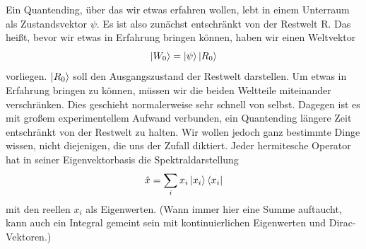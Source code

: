 \documentclass[12pt]{book}
\begin{document}
Ein Quantending, über das wir etwas erfahren wollen, lebt in einem Unterraum als Zustandsvektor $\psi$. Es ist also zunächst entschränkt von der Restwelt R. Das heißt, bevor wir etwas in Erfahrung bringen können, haben wir einen Weltvektor
\begin{equation}
\ket{W_0} = \ket{\psi}\ket{R_0}
\end{equation} 
vorliegen. $\ket{R_0}$ soll den Ausgangszustand der Restwelt darstellen. Um etwas in Erfahrung bringen zu können, müssen wir die beiden Weltteile miteinander verschränken. Dies geschieht normalerweise sehr schnell von selbst. Dagegen ist es mit großem experimentellem Aufwand verbunden, ein Quantending längere Zeit entschränkt von der Restwelt zu halten. Wir wollen jedoch ganz bestimmte Dinge wissen, nicht diejenigen, die uns der Zufall diktiert. Jeder hermitesche Operator hat in seiner Eigenvektorbasis die Spektraldarstellung
\begin{equation}
\hat{x} = \sum_i x_i \ket{x_i}\bra{x_i}
\end{equation} 
mit den reellen $x_i$ als Eigenwerten. (Wann immer hier eine Summe auftaucht, kann auch ein Integral gemeint sein mit kontinuierlichen Eigenwerten und Dirac-Vektoren.)
\end{document}

